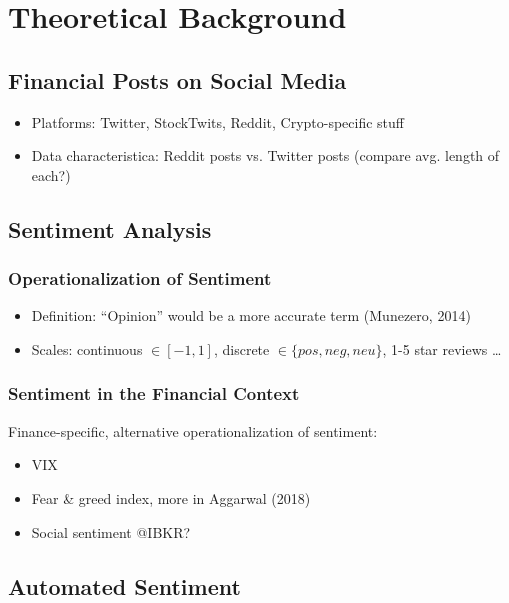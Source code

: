 \section{Theoretical Background}

\subsection{Financial Posts on Social Media}
\begin{itemize}[noitemsep]
	\item Platforms: Twitter, StockTwits, Reddit, Crypto-specific stuff
	\item Data characteristica: Reddit posts vs. Twitter posts (compare avg. length of each?)
\end{itemize}


\subsection{Sentiment Analysis}  %
\subsubsection{Operationalization of Sentiment}
\begin{itemize}[noitemsep]
	\item Definition: ``Opinion'' would be a more accurate term (Munezero, 2014)
	\item Scales: continuous $\in [-1, 1]$, discrete $\in \{pos, neg, neu\}$, 1-5 star reviews \dots
\end{itemize}
\subsubsection{Sentiment in the Financial Context}

Finance-specific, alternative operationalization of sentiment:
\begin{itemize}[noitemsep]
	\item VIX
	\item Fear \& greed index, more in Aggarwal (2018)
	\item Social sentiment @IBKR?
	
\end{itemize}

\subsection{Automated Sentiment}


